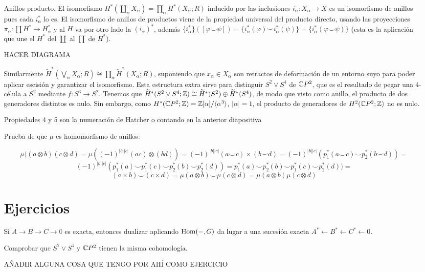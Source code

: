 \documentclass[TA.tex]{subfiles}
\begin{document}
\begin{ej}
Anillos producto. El isomorfismo $H^*(\coprod_\alpha X_\alpha)=\prod_\alpha H^*(X_\alpha;R)$ inducido por las inclusiones $i_\alpha:X_\alpha\to X$ es un isomorfismo de anillos pues cada $i_\alpha^*$ lo es. El isomorfismo de anillos de productos viene de la propiedad universal del producto directo, usando las proyecciones $\pi_\alpha:\prod H^*\to H^*_\alpha$ y al $H$ va por otro lado la $(i_\alpha)^*$, además $\{i_\alpha^*\}([\varphi\smile\psi])=\{i^*_\alpha(\varphi)\smile i_\alpha^*(\psi)\}=\{i^*_\alpha(\varphi\smile\psi)\}$ (esta es la aplicación que une el $H^*$ del $\coprod$ al $\prod$ de $H^*$).

HACER DIAGRAMA

 Similarmente $\widetilde{H}^*(\bigvee_\alpha X_\alpha;R)\cong\prod_\alpha\widetilde{H}^*(X_\alpha;R)$, suponiendo que $x_\alpha\in X_\alpha$ son retractos de deformación de un entorno suyo para poder aplicar escisión y garantizar el isomorfismo. Esta estructura extra sirve para distinguir $S^2\vee S^4$ de $\mathbb{C} P^2$, que es el resultado de pegar una 4-célula a $S^2$ mediante $f:S^3\to S^2$. Tenemos que $\widetilde{H}^*(S^2\vee S^4;\mathbb{Z})\cong \widetilde{H}^*(S^2)\oplus \widetilde{H}^*(S^4)$, de modo que visto como anillo, el producto de dos generadores distintos es nulo. Sin embargo, como $H^*(\mathbb{C} P^2;\mathbb{Z})=\mathbb{Z}[\alpha]/\langle{\alpha^3}\rangle$, $|\alpha|=1$, el producto de generadores de $H^2(\mathbb{C} P^2;\mathbb{Z})$ no es nulo.
\end{ej}






Propiedades 4 y 5 son la numeración de Hatcher o contando en la anterior diapositiva


Prueba de que $\mu$ es homomorfismo de anillos:

\[
\mu((a\otimes b)(c\otimes d)=\mu((-1)^{|b||c|}(ac)\otimes (bd))=(-1)^{|b||c|}(a\smile c)\times (b\smile d)=(-1)^{|b||c|}(p_1^*(a\smile c)\smile p_2^*(b\smile d))=
\]
\[
(-1)^{|b||c|}(p_1^*(a)\smile p_1^*(c)\smile p_2^*(b)\smile p_2^*(d))=p_1^*(a)\smile p_2^*(b)\smile p_1^*(c)\smile p_2^*(d))=
\]
\[
(a\times b)\smile (c\times d)=\mu(a\otimes b)\smile \mu (c\otimes d)=\mu(a\otimes b)\mu(c\otimes d)
\]


\section{Ejercicios}
\begin{ejer}
Si $A\to B\to C\to 0$ es exacta, entonces dualizar aplicando $\operatorname{Hom}(-,G)$ da lugar a una sucesión exacta $A^*\leftarrow B^*\leftarrow C^*\leftarrow 0$.
\end{ejer}

\begin{ejer}
Comprobar que $S^2\vee S^4$ y $\mathbb{C} P^2$ tienen la misma cohomología. 
\end{ejer}
AÑADIR ALGUNA COSA QUE TENGO POR AHÍ COMO EJERCICIO
\end{document}

